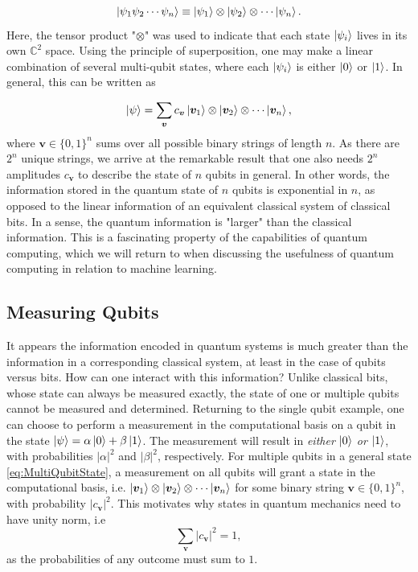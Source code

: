 \begin{equation}\label{eq:tensorProductState}
\ket{\psi_1 \psi_2 \cdots \psi_n} \equiv \ket{\psi_1} \otimes \ket{\psi_2} \otimes \cdots \ket{\psi_n}.
\end{equation}
Here, the tensor product "$\otimes$" was used to indicate that each state $\ket{\psi_i}$ lives in its own $\mathbb{C}^2$ space. Using the principle of superposition, one may make a linear combination of several multi-qubit states, where each $\ket{\psi_i}$ is either $\ket{0}$ or $\ket{1}$. In general, this can be written as

\begin{equation}\label{eq:MultiQubitState}
\ket{\psi} = \sum_{\boldsymbol{v}}c_{\boldsymbol{v}}\ket{\boldsymbol{v}_1} \otimes \ket{\boldsymbol{v}_2} \otimes \cdots \ket{\boldsymbol{v}_n},
\end{equation}
where $\boldsymbol{v} \in \{0,1\}^n$ sums over all possible binary strings of length $n$. As there are $2^n$ unique strings, we arrive at the remarkable result that one also needs $2^n$ amplitudes $c_{\boldsymbol{v}}$ to describe the state of $n$ qubits in general. In other words, the information stored in the quantum state of $n$ qubits is exponential in $n$, as opposed to the linear information of an equivalent classical system of classical bits. In a sense, the quantum information is "larger" than the classical information. This is a fascinating property of the  capabilities of quantum computing, which we will return to when discussing the usefulness of quantum computing in relation to machine learning.

\subsection{Measuring Qubits}\label{sec:MeasuringState}
It appears the information encoded in quantum systems is much greater than the information in a corresponding classical system, at least in the case of qubits versus bits. How can one interact with this information? Unlike classical bits, whose state can always be measured exactly, the state of one or multiple qubits cannot be measured and determined. Returning to the single qubit example, one can choose to perform a measurement in the computational basis on a qubit in the state $\ket{\psi} = \alpha \ket{0} + \beta \ket{1}$. The measurement will result in  \emph{either} $\ket{0}$ \emph{or} $\ket{1}$, with probabilities $|\alpha|^2$ and $|\beta|^2$, respectively. For multiple qubits in a general state \autoref{eq:MultiQubitState}, a measurement on all qubits will grant a state in the computational basis, i.e. $\ket{\boldsymbol{v}_1} \otimes \ket{\boldsymbol{v}_2} \otimes \cdots \ket{\boldsymbol{v}_n}$ for some binary string $\boldsymbol{v} \in \{0,1\}^n$, with probability $|c_{\boldsymbol{v}}|^2$. This motivates why states in quantum mechanics need to have unity norm, i.e
\begin{equation}\label{eq:MultiQubitState}
\sum_{\boldsymbol{v}}|c_{\boldsymbol{v}}|^2 = 1,
\end{equation} 
as the probabilities of any outcome must sum to $1$.

